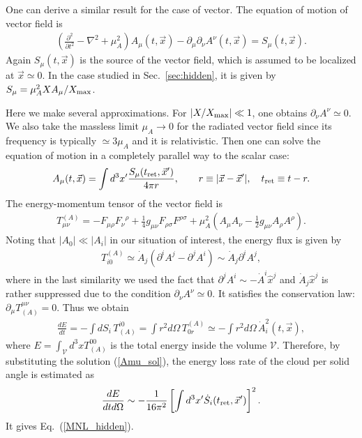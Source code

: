 \documentclass[%
 preprint,
 nofootinbib,
 amsmath,amssymb,
 aps,
 a4paper
]{revtex4-1}
\begin{document}
One can derive a similar result for the case of vector. The equation of motion of vector field is
\begin{align}
	\left(\frac{\partial^2}{\partial t^2} -\nabla^2 + \mu_A^2\right)A_\mu(t,\vec x) - \partial_\mu\partial_\nu A^\nu(t,\vec x) = S_\mu(t,\vec x).   \label{A_eom_s}
\end{align}
Again $S_\mu(t,\vec x)$ is the source of the vector field, which is assumed to be localized at $\vec x\simeq 0$.
In the case studied in Sec.~\ref{sec:hidden}, it is given by $S_\mu = \mu_A^2 X A_\mu / X_{\rm max}$.

Here we make several approximations. For $|X/X_{\rm max}|\ll 1$, one obtains $\partial_\nu A^\nu \simeq 0$. We also take the massless limit $\mu_A \to 0$ for the radiated vector field since its frequency is typically $\simeq 3\mu_A$ and it is relativistic.
Then one can solve the equation of motion in a completely parallel way to the scalar case:
\begin{align}
	A_\mu(t,\vec x) = \int d^3 x' \frac{S_{\mu}(t_{\rm ret},\vec x')}{4\pi r},~~~~~~r\equiv |\vec x-\vec x'|,~~~t_{\rm ret}\equiv t-r.
	\label{Amu_sol}
\end{align}
The energy-momentum tensor of the vector field is
\begin{align}
 	T^{(A)}_{\mu\nu}=-F_{\mu\rho}{F_\nu}^\rho +\frac{1}{4}g_{\mu\nu} F_{\rho\sigma}F^{\rho\sigma} + \mu_A^2\left(A_\mu A_\nu-\frac{1}{2}g_{\mu\nu}A_\rho A^\rho\right).
\end{align}
Noting that $|A_0| \ll |A_i|$ in our situation of interest, the energy flux is given by
\begin{align}
	T^{(A)}_{i0}\simeq \dot A_j(\partial^iA^j-\partial^j A^i) \sim \dot A_j \partial^iA^j,
\end{align}
where in the last similarity we used the fact that $\partial^j A^i \sim -\dot A^i\hat x^j$ and $ \dot A_j \hat x^j$ is rather suppressed due to the condition $\partial_\nu A^\nu \simeq 0$.
It satisfies the conservation law: $\partial_\mu T^{\mu\nu}_{(A)} = 0$. Thus we obtain
\begin{align}
	\frac{dE}{dt} = -\int dS_i\,T^{i0}_{(A)}= \int r^2 d\Omega\,T^{(A)}_{0r} \simeq - \int r^2 d\Omega\,\dot A_i^2(t,\vec x),
\end{align}
where $E = \int_{\mathcal V} d^3x T^{00}_{(A)}$ is the total energy inside the volume $\mathcal V$. Therefore, by substituting the solution (\ref{Amu_sol}), the energy loss rate of the cloud per solid angle is estimated as
\begin{align}
	\frac{dE}{dt d\Omega} \sim -\frac{1}{16\pi^2} \left[ \int d^3 x'  \dot S_i(t_{\rm ret},\vec x') \right]^2. 
\end{align}
It gives Eq.~(\ref{MNL_hidden}). 



\end{document}
